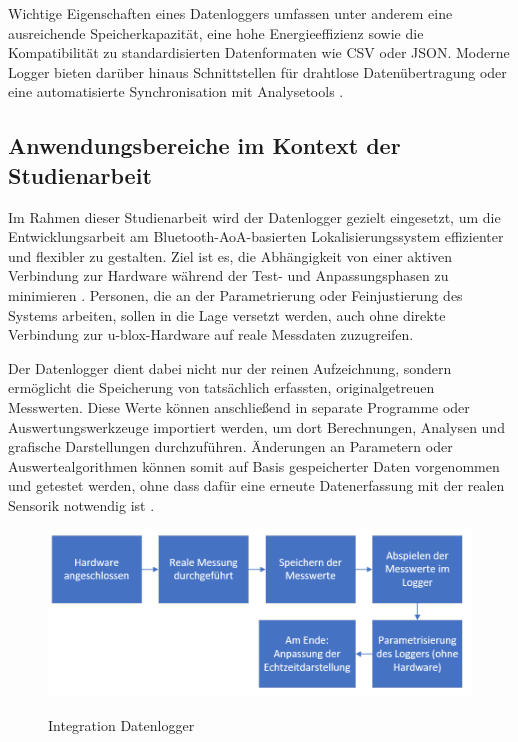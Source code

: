\documentclass[a4paper, 12pt]{article} %
\begin{document}
Wichtige Eigenschaften eines Datenloggers umfassen unter anderem eine ausreichende Speicherkapazität, eine hohe Energieeffizienz sowie die Kompatibilität zu standardisierten Datenformaten wie \ac{CSV} oder \ac{JSON}. Moderne Logger bieten darüber hinaus Schnittstellen für drahtlose Datenübertragung oder eine automatisierte Synchronisation mit Analysetools \cite{rs2022guide}.

\subsection{Anwendungsbereiche im Kontext der Studienarbeit}
Im Rahmen dieser Studienarbeit wird der Datenlogger gezielt eingesetzt, um die Entwicklungsarbeit am Bluetooth-\ac{AoA}-basierten Lokalisierungssystem effizienter und flexibler zu gestalten. Ziel ist es, die Abhängigkeit von einer aktiven Verbindung zur Hardware während der Test- und Anpassungsphasen zu minimieren \cite{poole2020data}. Personen, die an der Parametrierung oder Feinjustierung des Systems arbeiten, sollen in die Lage versetzt werden, auch ohne direkte Verbindung zur u-blox-Hardware auf reale Messdaten zuzugreifen.

Der Datenlogger dient dabei nicht nur der reinen Aufzeichnung, sondern ermöglicht die Speicherung von tatsächlich erfassten, originalgetreuen Messwerten. Diese Werte können anschließend in separate Programme oder Auswertungswerkzeuge importiert werden, um dort Berechnungen, Analysen und grafische Darstellungen durchzuführen. Änderungen an Parametern oder Auswertealgorithmen können somit auf Basis gespeicherter Daten vorgenommen und getestet werden, ohne dass dafür eine erneute Datenerfassung mit der realen Sensorik notwendig ist \cite{smith2018sensors}.

\begin{figure}[H]
    \includegraphics[width=1\linewidth]{images/Flussdiagramm Datenlogger.png}\\[1ex]
    \centering
    \caption{Integration Datenlogger}
    \label{ABBILDUNG}
\end{figure}
\end{document}
